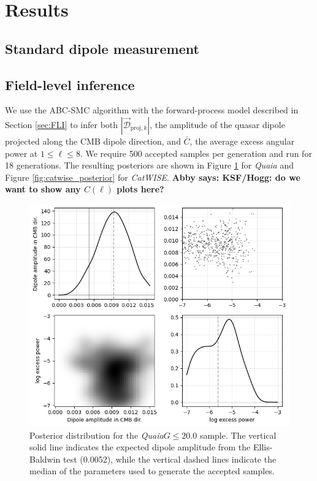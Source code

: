 \documentclass[modern]{aastex631}
\newcommand{\abby}[1]{\textbf{Abby says: #1}}
\newcommand{\catwise}{\textsl{CatWISE}\xspace}
\newcommand{\quaia}{\textsl{Quaia}\xspace}
\begin{document}
\section{Results}
\label{sec:results}

\subsection{Standard dipole measurement}
\label{sec:standard_results}


\subsection{Field-level inference}
\label{sec:fbi_results}
We use the ABC-SMC algorithm with the forward-process model described in Section \ref{sec:FLI} to infer both $|\vec{\mathcal{D}}_{\mathrm{proj},k}|$, the amplitude of the quasar dipole projected along the CMB dipole direction, and $\bar C$, the average excess angular power at $1\le\ell\le 8$.
We require 500 accepted samples per generation and run for 18 generations.
The resulting posteriors are shown in Figure \ref{fig:quaia_posterior} for \quaia and Figure \ref{fig:catwise_posterior} for \catwise.
\abby{KSF/Hogg: do we want to show any $C(\ell)$ plots here?}

\begin{figure}
    \centering
    \includegraphics[width=0.6\linewidth]{images/quaia_posterior.png}
    \caption{Posterior distribution for the \quaia $G\le 20.0$ sample. The vertical solid line indicates the expected dipole amplitude from the Ellis-Baldwin test (0.0052), while the vertical dashed lines indicate the median of the parameters used to generate the accepted samples.}
    \label{fig:quaia_posterior}
\end{figure}
\end{document}

